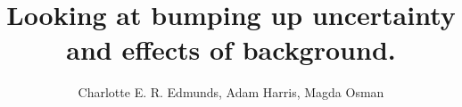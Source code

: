 \documentclass[doc, a4paper, apacite]{apa6}
\title{Looking at bumping up uncertainty and effects of background.}
\author{Charlotte E. R. Edmunds, Adam Harris, Magda Osman}
\affiliation{Queen Mary, UCL, University of London \\ 26 November 2020}
\begin{document}
\maketitle
\doublespacing

\clearpage
\newpage


\end{document}
